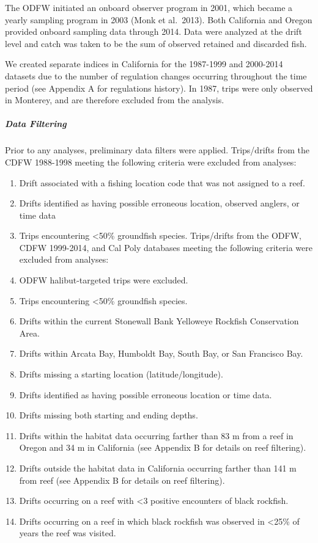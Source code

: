 \documentclass[11pt,
  english,
  letterpaper,
]{article}
\providecommand{\tightlist}{%
  \setlength{\itemsep}{0pt}\setlength{\parskip}{0pt}}
\providecommand{\tightlist}{%
  \setlength{\itemsep}{0pt}\setlength{\parskip}{0pt}}
\begin{document}
The ODFW initiated an onboard observer program in 2001, which became a yearly sampling program in 2003 (Monk et al.~2013). Both California and Oregon provided onboard sampling data through 2014. Data were analyzed at the drift level and catch was taken to be the sum of observed retained and discarded fish.

We created separate indices in California for the 1987-1999 and 2000-2014 datasets due to the number of regulation changes occurring throughout the time period (see Appendix A for regulations history). In 1987, trips were only observed in Monterey, and are therefore excluded from the analysis.

\hypertarget{data-filtering}{%
\subparagraph{Data Filtering}\label{data-filtering}}

Prior to any analyses, preliminary data filters were applied. Trips/drifts from the CDFW 1988-1998 meeting the following criteria were excluded from analyses:

\begin{enumerate}
\def\labelenumi{\arabic{enumi}.}
\tightlist
\item
  Drift associated with a fishing location code that was not assigned to a reef.
\item
  Drifts identified as having possible erroneous location, observed anglers, or time data
\item
  Trips encountering \textless50\% groundfish species. Trips/drifts from the ODFW, CDFW 1999-2014, and Cal Poly databases meeting the following criteria were excluded from analyses:
\item
  ODFW halibut-targeted trips were excluded.
\item
  Trips encountering \textless50\% groundfish species.
\item
  Drifts within the current Stonewall Bank Yelloweye Rockfish Conservation Area.
\item
  Drifts within Arcata Bay, Humboldt Bay, South Bay, or San Francisco Bay.
\item
  Drifts missing a starting location (latitude/longitude).
\item
  Drifts identified as having possible erroneous location or time data.
\item
  Drifts missing both starting and ending depths.
\item
  Drifts within the habitat data occurring farther than 83 m from a reef in Oregon and 34 m in California (see Appendix B for details on reef filtering).
\item
  Drifts outside the habitat data in California occurring farther than 141 m from reef (see Appendix B for details on reef filtering).
\item
  Drifts occurring on a reef with \textless3 positive encounters of black rockfish.
\item
  Drifts occurring on a reef in which black rockfish was observed in \textless25\% of years the reef was visited.
\end{enumerate}
\end{document}
